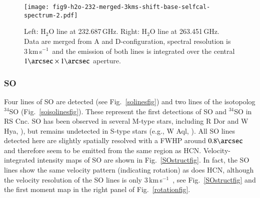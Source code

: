\documentclass{aa}
\newcommand{\kms}{\,km\,s$^{-1}$~}
\begin{document}
\begin{figure}[h]
    \centering
    \vspace{-3.0cm}
    \texttt{[image: fig9-h2o-232-merged-3kms-shift-base-selfcal-spectrum-2.pdf]}
    \caption{Left: H$_2$O line at 232.687\,GHz.  
             Right: H$_2$O line at 263.451\,GHz. Data are merged from A and 
             D-configuration, spectral resolution is 3\kms and the emission 
             of both lines is integrated over the central
             $1\arcsec \times 1\arcsec$ aperture.}
    \label{h2odetecfig}
\end{figure}

\subsubsection{SO}
\label{sosec}

Four lines of SO are detected (see Fig.~\ref{solinesfig}) and two
lines of the isotopolog $^{34}$SO (Fig.~\ref{soisolinesfig}).  These
represent the first detections of SO and $^{34}$SO in RS Cnc.  SO has
been observed in several M-type stars, including R Dor and W Hya,
\citep{ddbetal2016}), but remains undetected in S-type stars (e.g., W
Aql, \citet{2008A&A...480..431D,do2020}). All SO lines detected here
are slightly spatially resolved with a FWHP around $0.8\arcsec$ and
therefore seem to be emitted from the same region as
HCN. Velocity-integrated intensity maps of SO are shown in
Fig.~\ref{SOstructfig}. In fact, the SO lines show the same velocity
pattern (indicating rotation) as does HCN, although the velocity
resolution of the SO lines is only 3\kms, see  Fig.~\ref{SOstructfig}
and the first moment map in the right panel of Fig.~\ref{rotationfig}.
\end{document}
